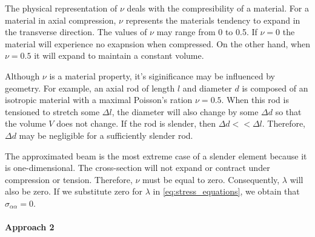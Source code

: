 The physical representation of $\nu$ deals with the compresibility of a material.
For a material in axial compression, $\nu$ represents the materials tendency to expand in the transverse direction.
The values of $\nu$ may range from 0 to 0.5.
If $\nu = 0$ the material will experience no exapnsion when compressed.
On the other hand, when $\nu = 0.5$ it will expand to maintain a constant volume. 

Although $\nu$ is a material property, it's siginificance may be influenced by geometry.
For example, an axial rod of length $l$ and diameter $d$ is composed of an isotropic material with a maximal Poisson's ration $\nu = 0.5$.
When this rod is tensioned to stretch some $\Delta l$, the diameter will also change by some $\Delta d$ so that the volume $V$ does not change.
If the rod is slender, then $\Delta d << \Delta l$.
Therefore, $\Delta d$ may be negligible for a sufficiently slender rod.

The approximated beam is the most extreme case of a slender element because it is one-dimensional.
The cross-section will not expand or contract under compression or tension. 
Therefore, $\nu$ must be equal to zero.
Consequently, $\lambda$ will also be zero.
If we substitute zero for $\lambda$ in \cref{eq:stress_equations}, we obtain that $\sigma_{\alpha\alpha} = 0$.

%


\paragraph{Approach 2}
%
%

